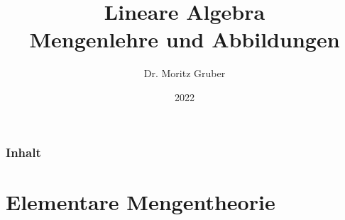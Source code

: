 

\title{Lineare Algebra\\[3mm] 
	\large Mengenlehre und Abbildungen
}
\author{Dr. Moritz Gruber} 
\date{2022}




%
\begin{frame}[plain] 
 \titlepage
\end{frame}
%
%
\begin{frame}\frametitle{Inhalt}
   \tableofcontents
\end{frame}
\section{Elementare Mengentheorie}
